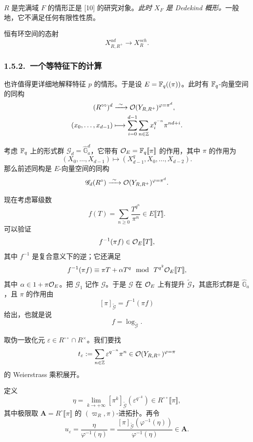 $R$ 是完满域 $F$ 的情形正是 [10] 的研究对象。\emph{此时 $X_F$ 是 Dedekind 概形。}一般地，它不满足任何有限性性质。

恒有环空间的态射
\[
X^{ad}_{R,R^+}\longrightarrow X^{sch}_R .
\]

\subsubsection*{1.5.2.\ 一个等特征下的计算}

也许值得更详细地解释特征 $p$ 的情形。于是设 $E=\mathbb{F}_q((\pi))$。此时有 $\mathbb{F}_q$-向量空间的同构
\[
\begin{aligned}
(R^{\circ\circ})^d&\xrightarrow{\ \sim\ }\oo(Y_{R,R^+})^{\varphi=\pi^d},\\
(x_0,\dots,x_{d-1})&\longmapsto\sum_{i=0}^{d-1}\sum_{n\in\ZZ}x_i^{q^{-n}}\pi^{nd+i}.
\end{aligned}
\]

考虑 $\mathbb{F}_q$ 上的形式群 $\mathscr{G}_d=\widehat{\mathbb{G}}_a^d$，它带有 $\mathcal{O}_E=\mathbb{F}_q\llbracket\pi\rrbracket$ 的作用，其中 $\pi$ 的作用为
\[
(X_0,\dots,X_{d-1})\longmapsto(X_{d-1}^q,X_0,\dots,X_{d-2}).
\]
那么前述同构是 $E$-向量空间的同构
\[
\mathscr{G}_d(R^\circ)\xrightarrow{\ \sim\ }\oo(Y_{R,R^+})^{\varphi=\pi^d}.
\]

现在考虑幂级数
\[
f(T)=\sum_{n\ge 0}\frac{T^{q^n}}{\pi^n}\in E\llbracket T\rrbracket .
\]
可以验证
\[
f^{-1}(\pi f)\in\mathcal{O}_E\llbracket T\rrbracket ,
\]
其中 $f^{-1}$ 是复合意义下的逆；它还满足
\[
f^{-1}(\pi f)\equiv\pi T+\alpha T^q\ \ \mathrm{mod}\ \ T^{q^2}\mathcal{O}_E\llbracket T\rrbracket ,
\]
其中 $\alpha\in 1+\pi\mathcal{O}_E$。把 $\mathscr{G}_1$ 记作 $\mathscr{G}$。于是 $\mathscr{G}$ 在 $\mathcal{O}_E$ 上有提升 $\widetilde{\mathscr{G}}$，其底形式群是 $\widehat{\mathbb{G}}_a$，且 $\pi$ 的作用由
\[
[\pi]_{\widetilde{\mathscr{G}}}=f^{-1}(\pi f)
\]
给出，也就是说
\[
f=\log_{\widetilde{\mathscr{G}}}.
\]

取伪一致化元 $\varepsilon\in R^{\circ\circ}\cap R^\times$。我们要找
\[
t_\varepsilon:=\sum_{n\in\mathbb{Z}}\varepsilon^{q^{-n}}\pi^n\in\mathcal{O}(Y_{R,R^+})^{\varphi=\pi}
\]
的 Weierstrass 乘积展开。

\leavevmode{}定义
\[
\eta=\lim_{k\to+\infty}[\pi^k]_{\widetilde{\mathscr{G}}}(\varepsilon^{q^{-k}})\in R^{\circ\circ}\llbracket\pi\rrbracket ,
\]
其中极限取 $\mathbf{A}=R^\circ\llbracket\pi\rrbracket$ 的 $(\varpi_R,\pi)$-进拓扑。再令
\[
u_\varepsilon=\frac{\eta}{\varphi^{-1}(\eta)}=\frac{[\pi]_{\widetilde{\mathscr{G}}}(\varphi^{-1}(\eta))}{\varphi^{-1}(\eta)}\in\mathbf{A}.
\]

